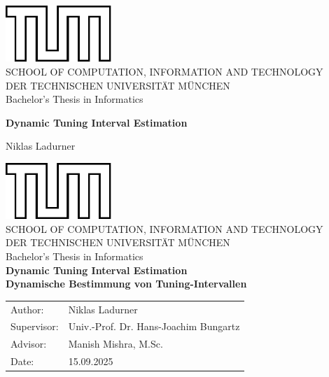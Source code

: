 \documentclass[11pt,
               a4paper,
               bibtotoc,
               idxtotoc,
               headsepline,
               footsepline,
               footexclude,
               BCOR12mm,
               DIV13,
               openany
               ]
               {scrbook}
\def\doctype{Bachelor's Thesis\xspace}
\def\studyProgram{Informatics}
\def\title{Dynamic Tuning Interval Estimation}
\def\titleGer{Dynamische Bestimmung von Tuning-Intervallen}
\def\author{Niklas Ladurner}
\def\supervisor{Univ.-Prof. Dr. Hans-Joachim Bungartz}
\def\advisor{Manish Mishra, M.Sc.}
\def\date{15.09.2025}
\begin{document}
\frontmatter
%
% 

\def\bcorcor{0.15cm}
\addtolength{\hoffset}{\bcorcor}
\thispagestyle{empty}
\vspace{4cm}
\begin{center}
	\includegraphics[width=4cm]{templateStuff/tumlogo.pdf}\\[5mm]
	\huge SCHOOL OF COMPUTATION, INFORMATION AND TECHNOLOGY\\[5mm]
	\large DER TECHNISCHEN UNIVERSITÄT MÜNCHEN\\[24mm]

	{\Large \doctype in \studyProgram}\\[20mm]
	{\huge\bf \title\par}
	\vspace{15mm}
	{\LARGE  \author}
\end{center}

\cleardoubleemptypage

% 
%

\def\bcorcor{0.15cm}
\addtolength{\hoffset}{\bcorcor}
\thispagestyle{empty}
\vspace{10mm}
\begin{center}
	\includegraphics[width=4cm]{templateStuff/tumlogo.pdf}\\[5mm]
	\huge SCHOOL OF COMPUTATION, INFORMATION AND TECHNOLOGY\\[5mm]
	\large DER TECHNISCHEN UNIVERSITÄT MÜNCHEN\\[24mm]
	{\Large \doctype in \studyProgram}\\[20mm]
	{\LARGE\bf \title}\\[10mm]
	{\LARGE\bf \titleGer}\\[10mm]
	\begin{tabular}{ll}
		\Large Author:     & \Large \author     \\[2mm]
		\Large Supervisor: & \Large \supervisor \\[2mm]
		\Large Advisor:    & \Large \advisor    \\[2mm]
		\Large Date:       & \Large \date
	\end{tabular}
\end{center}
\end{document}
